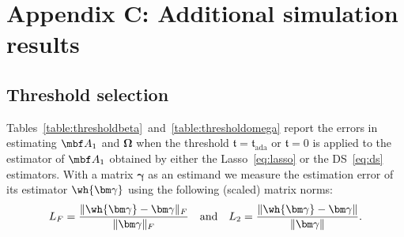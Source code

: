 \section{Appendix C: Additional simulation results}
\label{sec:appendix:sim}

\subsection{Threshold selection}

Tables~\ref{table:thresholdbeta}~and~\ref{table:thresholdomega} report the errors in estimating $\mbf A_1$ and $\bm\Omega$ when the threshold $\mathfrak{t} = \mathfrak{t}_{\text{ada}}$ or $\mathfrak{t} = 0$ is applied to the estimator of $\mbf A_1$ obtained by either the Lasso~\eqref{eq:lasso} or the DS~\eqref{eq:ds} estimators. 
With a matrix $\bm\gamma$ as an estimand
we measure the estimation error of its estimator $\wh{\bm\gamma}$
using the following (scaled) matrix norms:
\begin{align*}
L_F = \frac{\Vert \wh{\bm\gamma} - \bm\gamma \Vert_F}{\Vert \bm\gamma \Vert_F} \quad \text{and} \quad L_2 = \frac{\Vert \wh{\bm\gamma} - \bm\gamma \Vert}{\Vert \bm\gamma \Vert}.
\end{align*}

